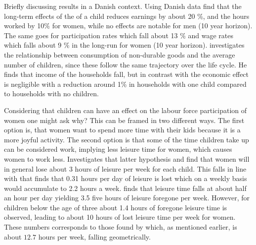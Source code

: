 Briefly discussing results in a Danish context. Using Danish data \textcite{kleven_children_2019} find that the long-term effects of the of a child reduces earnings by about 20 \%, and the hours worked by 10\% for women, while no effects are notable for men (10 year horizon). The same goes for participation rates which fall about 13 \% and wage rates which falls about 9 \% in the long-run for women (10 year horizon). \textcite{jorgensen_life-cycle_2017} investigates the relationship between consumption of non-durable goods and the average number of children, since these follow the same trajectory over the life cycle. He finds that income of the households fall, but in contrast with \textcite{kleven_children_2019} the economic effect is negligible with a reduction around 1\% in households with one child compared to households with no children. 

Considering that children can have an effect on the labour force participation of women one might ask why? This can be framed in two different ways. The first option is, that women want to spend more time with their kids because it is a more joyful activity. The second option is that some of the time children take up can be considered work, implying less leisure time for women, which causes women to work less. \textcite{firestone_estimation_1988} Investigates that latter hypothesis and find that  women will in general lose about 3 hours of leisure per week for each child. This falls in line with \textcite{thrane_men_2000} that finds that 0.31 hours per day of leisure is lost which on a weekly basis would accumulate to 2.2 hours a week. \textcite{ekert-jaffe_time_2015} finds that leisure time falls at about half an hour per day yielding 3.5 five hours of leisure foregone per week. However, for children below the age of three about 1.4 hours of foregone leisure time is observed, leading to about 10 hours of lost leisure time per week for women. These numbers corresponds to those found by \textcite{hotz_empirical_1988} which, as mentioned earlier, is about $12.7$ hours per week, falling geometrically. 
